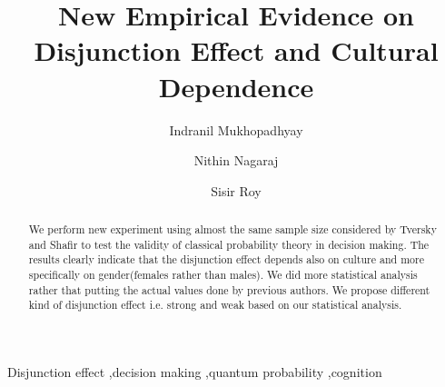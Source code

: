 \documentclass[review]{elsarticle}
\begin{document}
\begin{frontmatter}

\title{New Empirical Evidence on Disjunction
Effect and Cultural Dependence}

\author{Indranil Mukhopadhyay}
\address{Human Genomics Unit, Indian Statistical Institute, Calcutta-700035.}

\author{Nithin Nagaraj}
\address{Consciousness Studies Programme, National Institute of Advanced Studies, IISc. Campus, Bengaluru 560012.}
\author{Sisir Roy}
\address{Conciousness Studies Programme, National Institute of Advanced Studies,IISC Campus, Bengaluru 560012.}






\begin{abstract}
We perform new experiment using almost the same sample size considered by Tversky and Shafir to test the validity of classical probability theory in decision making. The results clearly indicate that the disjunction effect depends also on culture and more specifically on gender(females rather than males). We did more statistical analysis rather that putting the actual values done by previous authors. We propose different kind of disjunction effect i.e. strong and weak based on our statistical analysis. 
\end{abstract}

\begin{keyword}
Disjunction effect \sep decision making \sep quantum probability \sep cognition
\end{keyword}

\end{frontmatter}
\end{document}
